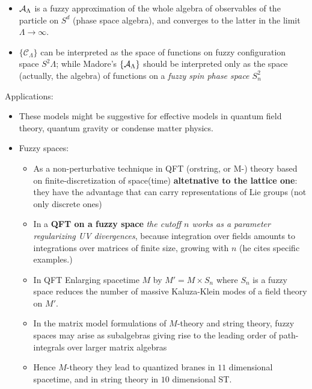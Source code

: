 {\begin{itemize}
        \item $\mathcal A_\Lambda$ is a fuzzy approximation of the whole algebra of observables of the particle on $S^d$ (phase space algebra), and converges to the latter in the limit $\Lambda \to \infty$.
        
        \item $\{\mathcal C_\Lambda\}$ can be interpreted as the space of functions on fuzzy configuration space $S^2\Lambda$; while Madore's $\{\mathcal A_\Lambda\}$ should be interpreted only as the space (actually, the algebra) of functions on a \textit{fuzzy spin phase space $S^2_n$}
            
        \end{itemize}
    
    \lin
    
    Applications:
    
        \begin{itemize}
            
        \item \cite{FioreTheCase2020} These models might be suggestive for effective models in quantum field theory, quantum gravity or condense matter physics.
        
        \item Fuzzy spaces:
        
            \begin{itemize}
                
            \item \cite{FioreTheCase2020}As a non-perturbative technique in QFT (orstring, or M-) theory based on finite-discretization of space(time) \textbf{altetnative to the lattice one}: they have the advantage that can carry representations of Lie groups (not only discrete ones)
            
            \item In a \textbf{QFT on a fuzzy space} \textit{the cutoff $n$ works as a parameter regularizing UV divergences}, because integration over fields amounts to integrations over matrices of finite size, growing with $n$ (he cites specific examples.)
            
            
            \item In QFT Enlarging spacetime $M$ by $M' = M \times S_n$ where $S_n$ is a fuzzy space reduces the number of massive Kaluza-Klein modes of a field theory on $M'$.
            
            \item In the matrix model formulations of $M$-theory and string theory, fuzzy spaces may arise as subalgebras giving rise to the leading order of path-integrals over larger matrix algebras
            
            \item Hence $M$-theory they lead to quantized branes in $11$ dimensional spacetime, and in string theory in $10$ dimensional ST.
                
            \end{itemize}
            
        \end{itemize}
}

